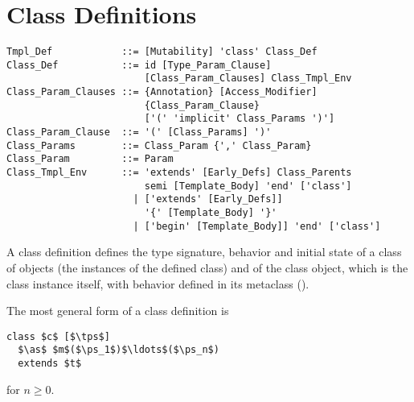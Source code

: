 \section{Class Definitions}
\label{sec:class-definitions}

\syntax\begin{lstlisting}
Tmpl_Def            ::= [Mutability] 'class' Class_Def
Class_Def           ::= id [Type_Param_Clause] 
                        [Class_Param_Clauses] Class_Tmpl_Env
Class_Param_Clauses ::= {Annotation} [Access_Modifier] 
                        {Class_Param_Clause}
                        ['(' 'implicit' Class_Params ')']
Class_Param_Clause  ::= '(' [Class_Params] ')'
Class_Params        ::= Class_Param {',' Class_Param}
Class_Param         ::= Param
Class_Tmpl_Env      ::= 'extends' [Early_Defs] Class_Parents
                        semi [Template_Body] 'end' ['class']
                      | ['extends' [Early_Defs]] 
                        '{' [Template_Body] '}'
                      | ['begin' [Template_Body]] 'end' ['class']
\end{lstlisting}

A class definition defines the type signature, behavior and initial state of a class of objects (the instances of the defined class) and of the class object, which is the class instance itself, with behavior defined in its metaclass (). 

The most general form of a class definition is
\begin{lstlisting}
class $c$ [$\tps$]
  $\as$ $m$($\ps_1$)$\ldots$($\ps_n$)
  extends $t$
\end{lstlisting}
for $n \geq 0$. 

